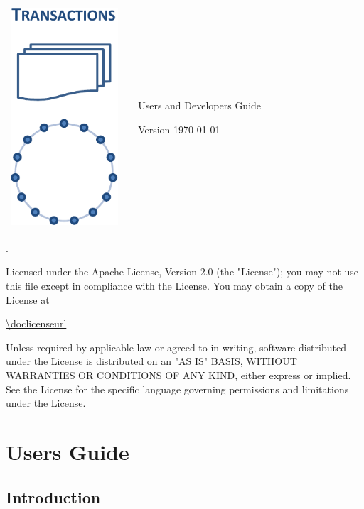 \documentclass[a4paper]{scrreprt}
\begin{document}
\vspace*{4cm}
\thispagestyle{empty}
\setlength{\parskip}{1ex}
\begin{tabular}{p{4cm}p{0.5cm}p{10cm}}
\parbox{4cm}{\includegraphics[width=4cm]{scalaris-layers}}
& &\sffamily\bfseries\Huge
  \bigskip {\textcolor{rltblue}{\scalaris{}:}}

\medskip
 \mdseries Users and Developers Guide

\bigskip\medskip
\LARGE Version \docversion{} \hfill \today\\
\end{tabular}
\vfill
{\scriptsize
\doccopyright{}.

Licensed under the Apache License, Version 2.0 (the "License");
you may not use this file except in compliance with the License.
You may obtain a copy of the License at

\url{\doclicenseurl}

Unless required by applicable law or agreed to in writing, software
distributed under the License is distributed on an "AS IS" BASIS,
WITHOUT WARRANTIES OR CONDITIONS OF ANY KIND, either express or implied.
See the License for the specific language governing permissions and
limitations under the License.
}

\tableofcontents

\part{Users Guide}

\chapter{Introduction}
\end{document}
